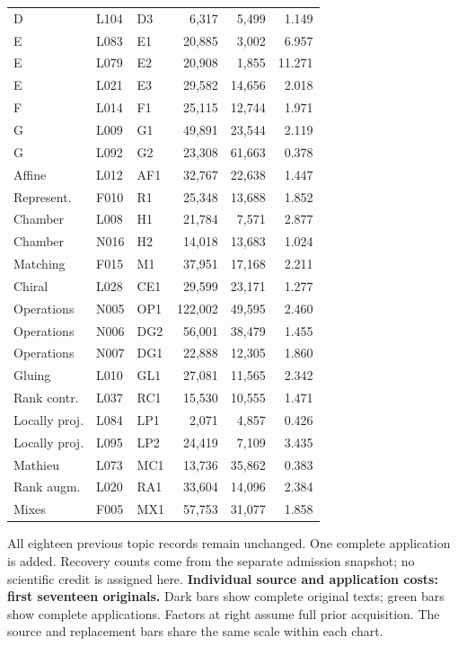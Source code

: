 \documentclass[11pt,a4paper]{article}
\begin{document}
\begin{center}
\begin{tabular}{lllrrr}
D & L104 & D3 & 6,317 & 5,499 & 1.149 \\
E & L083 & E1 & 20,885 & 3,002 & 6.957 \\
E & L079 & E2 & 20,908 & 1,855 & 11.271 \\
E & L021 & E3 & 29,582 & 14,656 & 2.018 \\
F & L014 & F1 & 25,115 & 12,744 & 1.971 \\
G & L009 & G1 & 49,891 & 23,544 & 2.119 \\
G & L092 & G2 & 23,308 & 61,663 & 0.378 \\
Affine & L012 & AF1 & 32,767 & 22,638 & 1.447 \\
Represent. & F010 & R1 & 25,348 & 13,688 & 1.852 \\
Chamber & L008 & H1 & 21,784 & 7,571 & 2.877 \\
Chamber & N016 & H2 & 14,018 & 13,683 & 1.024 \\
Matching & F015 & M1 & 37,951 & 17,168 & 2.211 \\
Chiral & L028 & CE1 & 29,599 & 23,171 & 1.277 \\
Operations & N005 & OP1 & 122,002 & 49,595 & 2.460 \\
Operations & N006 & DG2 & 56,001 & 38,479 & 1.455 \\
Operations & N007 & DG1 & 22,888 & 12,305 & 1.860 \\
Gluing & L010 & GL1 & 27,081 & 11,565 & 2.342 \\
Rank contr. & L037 & RC1 & 15,530 & 10,555 & 1.471 \\
Locally proj. & L084 & LP1 & 2,071 & 4,857 & 0.426 \\
Locally proj. & L095 & LP2 & 24,419 & 7,109 & 3.435 \\
Mathieu & L073 & MC1 & 13,736 & 35,862 & 0.383 \\
Rank augm. & L020 & RA1 & 33,604 & 14,096 & 2.384 \\
Mixes & F005 & MX1 & 57,753 & 31,077 & 1.858 \\
\bottomrule\end{tabular}\end{center}
All eighteen previous topic records remain unchanged. One complete application is added. Recovery counts come from the separate admission snapshot; no scientific credit is assigned here.
\newpage
\textbf{Individual source and application costs: first seventeen originals.}
Dark bars show complete original texts; green bars show complete applications. Factors at right assume full prior acquisition. The source and replacement bars share the same scale within each chart.
\end{document}

